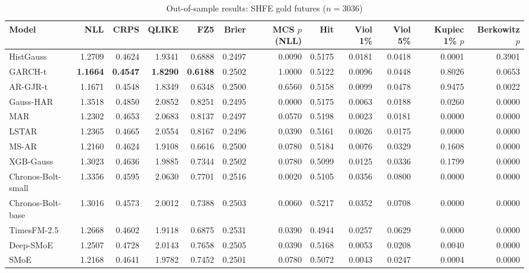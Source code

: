 \begin{table}[!htbp]\centering\scriptsize
\caption{Out-of-sample results: SHFE gold futures ($n=3036$)}\label{tab:asset_au_main}
\begin{adjustbox}{max width=\textwidth}
\begin{tabular}{lrrrrrrrrrrr}
\toprule
Model & NLL & CRPS & QLIKE & FZ5 & Brier & MCS $p$ (NLL) & Hit & Viol 1\% & Viol 5\% & Kupiec 1\% $p$ & Berkowitz $p$\\
\midrule
HistGauss & 1.2709 & 0.4624 & 1.9341 & 0.6888 & 0.2497 & 0.0090 & 0.5175 & 0.0181 & 0.0418 & 0.0001 & 0.3901\\
GARCH-t & \textbf{1.1664} & \textbf{0.4547} & \textbf{1.8290} & \textbf{0.6188} & 0.2502 & 1.0000 & 0.5122 & 0.0096 & 0.0448 & 0.8026 & 0.0653\\
AR-GJR-t & 1.1671 & 0.4548 & 1.8349 & 0.6348 & 0.2500 & 0.6560 & 0.5158 & 0.0099 & 0.0478 & 0.9475 & 0.0022\\
Gauss-HAR & 1.3518 & 0.4850 & 2.0852 & 0.8251 & 0.2495 & 0.0000 & 0.5175 & 0.0063 & 0.0188 & 0.0260 & 0.0000\\
MAR & 1.2302 & 0.4653 & 2.0683 & 0.8137 & 0.2497 & 0.0570 & 0.5198 & 0.0023 & 0.0181 & 0.0000 & 0.0000\\
LSTAR & 1.2365 & 0.4665 & 2.0554 & 0.8167 & 0.2496 & 0.0390 & 0.5161 & 0.0026 & 0.0175 & 0.0000 & 0.0000\\
MS-AR & 1.2160 & 0.4624 & 1.9108 & 0.6616 & 0.2500 & 0.0780 & 0.5184 & 0.0076 & 0.0329 & 0.1608 & 0.0000\\
XGB-Gauss & 1.3023 & 0.4636 & 1.9885 & 0.7344 & 0.2502 & 0.0780 & 0.5099 & 0.0125 & 0.0336 & 0.1799 & 0.0000\\
Chronos-Bolt-small & 1.3356 & 0.4595 & 2.0630 & 0.7701 & 0.2516 & 0.0020 & 0.5105 & 0.0356 & 0.0800 & 0.0000 & 0.0000\\
Chronos-Bolt-base & 1.3016 & 0.4573 & 2.0012 & 0.7388 & 0.2503 & 0.0060 & 0.5217 & 0.0352 & 0.0708 & 0.0000 & 0.0000\\
TimesFM-2.5 & 1.2668 & 0.4602 & 1.9118 & 0.6875 & 0.2531 & 0.0390 & 0.4944 & 0.0257 & 0.0629 & 0.0000 & 0.0000\\
Deep-SMoE & 1.2507 & 0.4728 & 2.0143 & 0.7658 & 0.2505 & 0.0390 & 0.5168 & 0.0053 & 0.0208 & 0.0040 & 0.0000\\
SMoE & 1.2168 & 0.4641 & 1.9782 & 0.7452 & 0.2501 & 0.0780 & 0.5072 & 0.0043 & 0.0247 & 0.0004 & 0.0000\\
\bottomrule
\end{tabular}
\end{adjustbox}
\end{table}